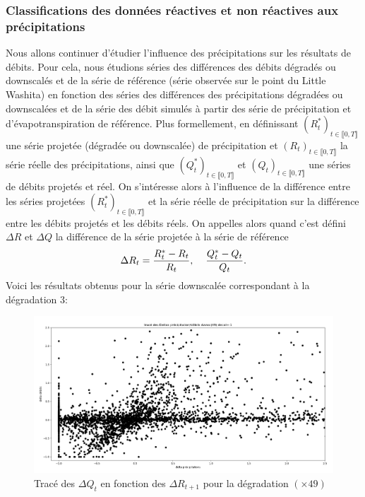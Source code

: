 \documentclass[a4paper,11pt]{article}
\numberwithin{equation}{section}
\begin{document}
\subsubsection{Classifications des données réactives et non réactives aux précipitations}
\label{ch:classification delta deb delta pluie}

Nous allons continuer d'étudier l'influence des précipitations sur les résultats de débits. Pour cela, nous étudions séries des différences des débits dégradés ou downscalés et de la série de référence (série observée sur le point du Little Washita) en fonction des séries des différences des précipitations dégradées ou downscalées et de la série des débit simulés à partir des série de précipitation et d'évapotranspiration de référence. Plus formellement, en définissant $(R^{*}_t)_{t \in \llbracket 0, T\rrbracket}$ une série projetée (dégradée ou downscalée) de précipitation et $(R_t)_{t \in \llbracket 0, T\rrbracket}$ la série réelle des précipitations, ainsi que $(Q^{*}_t)_{t \in \llbracket 0, T\rrbracket}$ et $(Q_t)_{t \in \llbracket 0, T\rrbracket}$ une séries de débits projetés et réel. On s'intéresse alors à l'influence de la différence entre les séries projetées $(R^{*}_t)_{t \in \llbracket 0, T\rrbracket}$ et la série réelle de précipitation sur la différence entre les débits projetés et les débits réels. On appelles alors quand c'est défini $\Delta R$ et $\Delta Q$ la différence de la série projetée à la série de référence 
\[\Delta R_t=\frac{R^{*}_t-R_t}{R_t}, \hspace{4mm} \frac{Q^{*}_t-Q_t}{Q_t}.\]
Voici les résultats obtenus pour la série downscalée correspondant à la dégradation $3$:
\begin{figure}[H]
	\label{fig-deb_prec_3}
	\begin{center}
		\includegraphics[scale=0.25]{deb_prec_dec1.png}
	\end{center}
	\caption{Tracé des $\Delta Q_t$ en fonction des $\Delta R_{t+1}$ pour la dégradation $(\times49)$}
\end{figure}
\end{document}
